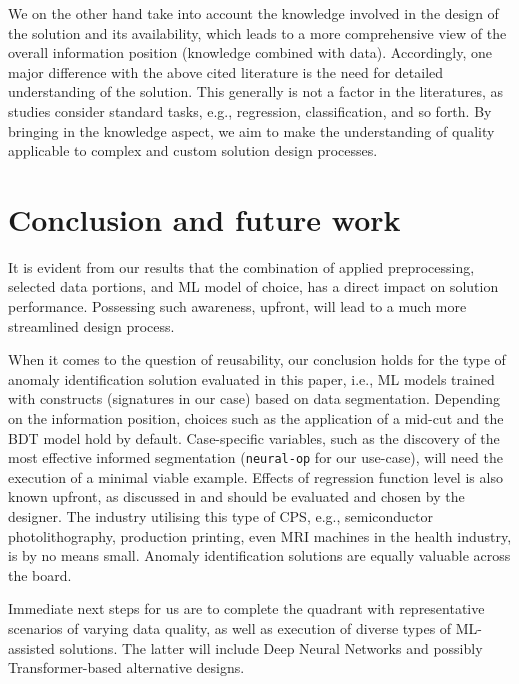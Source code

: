 We on the other hand take into account the knowledge involved in the design of the solution and its availability, which leads to a more comprehensive view of the overall information position (knowledge combined with data). Accordingly, one major difference with the above cited literature is the need for detailed understanding of the solution. This generally is not a factor in the literatures, as studies consider standard tasks, e.g., regression, classification, and so forth. By bringing in the knowledge aspect, we aim to make the understanding of quality applicable to complex and custom solution design processes.

\section{Conclusion and future work}
\label{sec:conclusion}
It is evident from our results that the combination of applied preprocessing, selected data portions, and ML model of choice, has a direct impact on solution performance. Possessing such awareness, upfront, will lead to a much more streamlined design process.

When it comes to the question of reusability, our conclusion holds for the type of anomaly identification solution evaluated in this paper, i.e., ML models trained with constructs (signatures in our case) based on data segmentation. Depending on the information position, choices such as the application of a mid-cut and the BDT model hold by default. Case-specific variables, such as the discovery of the most effective informed segmentation (\texttt{neural-op} for our use-case), will need the execution of a minimal viable example. Effects of regression function level is also known upfront, as discussed in  and should be evaluated and chosen by the designer. The industry utilising this type of CPS, e.g., semiconductor photolithography, production printing, even MRI machines in the health industry, is by no means small. Anomaly identification solutions are equally valuable across the board.

Immediate next steps for us are to complete the quadrant with representative scenarios of varying data quality, as well as execution of diverse types of ML-assisted solutions. The latter will include Deep Neural Networks and possibly Transformer-based alternative designs.

